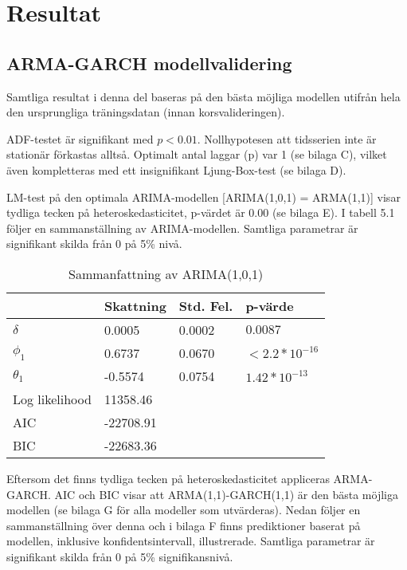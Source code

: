 \documentclass[11pt]{article}
\numberwithin{equation}{section}
\numberwithin{table}{section}
\numberwithin{figure}{section}
\begin{document}
\newpage
\section{Resultat}
\subsection{ARMA-GARCH modellvalidering}
Samtliga resultat i denna del baseras på den bästa möjliga modellen utifrån hela den ursprungliga träningsdatan (innan korsvalideringen). 

ADF-testet är signifikant med \(p<0.01\). Nollhypotesen att tidsserien inte är stationär förkastas alltså. Optimalt antal laggar (p) var 1 (se bilaga C), vilket även kompletteras med ett insignifikant Ljung-Box-test (se bilaga D). \par

LM-test på den optimala ARIMA-modellen [ARIMA(1,0,1) = ARMA(1,1)] visar tydliga tecken på heteroskedasticitet, p-värdet är 0.00 (se bilaga E). I tabell 5.1 följer en sammanställning av ARIMA-modellen. Samtliga parametrar är signifikant skilda från 0 på 5\% nivå. \par

\begin{table}[H]
\centering
\caption{Sammanfattning av ARIMA(1,0,1)}
\begin{tabular}{||llll||}
\hline
              & \textbf{Skattning}  & \textbf{Std. Fel.} & \textbf{p-värde}          \\
              \hline \hline
$\delta$     & 0.0005    & 0.0002    & $0.0087$         \\
$\phi_1$      & 0.6737    & 0.0670    & $<2.2*10^{-16}$  \\
$\theta_1$    & -0.5574   & 0.0754    & $1.42*10^{-13}$  \\ 
\hline \hline
Log likelihood & 11358.46  &           &                  \\
AIC           & -22708.91 &           &                  \\
BIC           & -22683.36 &           &     \\
\hline
\end{tabular}
\end{table}

Eftersom det finns tydliga tecken på heteroskedasticitet appliceras ARMA-GARCH. AIC och BIC visar att ARMA(1,1)-GARCH(1,1) är den bästa möjliga modellen (se bilaga G för alla modeller som utvärderas). Nedan följer en sammanställning över denna och i bilaga F finns prediktioner baserat på modellen, inklusive konfidentsintervall, illustrerade. Samtliga parametrar är signifikant skilda från 0 på 5\% signifikansnivå.
\end{document}
